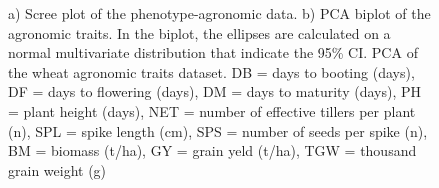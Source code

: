\documentclass[a4paper,onecolumn,10pt]{article}
\begin{document}
\begin{figure}[H]
    \centering
    \caption{
        a) Scree plot of the phenotype-agronomic data.
        b) PCA biplot of the agronomic traits.
        In the biplot, the ellipses are calculated on a normal multivariate distribution that indicate the 95\% CI.
        PCA of the wheat agronomic traits dataset.
        DB = days to booting (days),
        DF = days to flowering (days),
        DM = days to maturity (days),
        PH = plant height (days),
        NET = number of effective tillers per plant (n),
        SPL = spike length (cm),
        SPS = number of seeds per spike (n),
        BM = biomass (t/ha),
        GY = grain yeld (t/ha),
        TGW = thousand grain weight (g)}
    \label{fig:scree_PCA_location}
\end{figure}

\newpage
\thispagestyle{empty}




\end{document}
